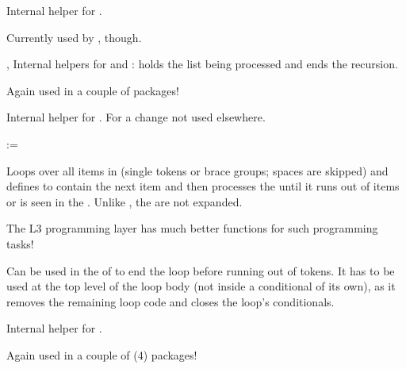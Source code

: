 \documentclass{l3in2edoc}
\begin{document}
\begin{function}[int]
  {
    \@forloop
  }
  Internal helper for .

  Currently used by , though.
\end{function}



\begin{function}[int]
  {
    \@fornoop,
    \@fortmp
  }
  Internal helpers for  and :  holds the
  list being processed and  ends the recursion.

  Again used in a couple of packages!
\end{function}



\begin{function}[int]
  {
    \@iforloop
  }
  Internal helper for . For a change not used elsewhere.
\end{function}


\begin{function}[]
  {
    \@tfor
  }
  \begin{syntax}
      :=   
  \end{syntax}
  Loops over all items in  (single tokens or brace groups;
  spaces are skipped) and defines  to contain the next
  item and then processes the  until it runs out of
  items or  is seen in the . Unlike
  , the  are not expanded.

  The L3 programming layer has much better functions for such
  programming tasks!
\end{function}

\begin{function}[]
  {
    \@break@tfor
  }
%
  Can be used in the  of  to end the loop
  before running out of tokens. It has to be used at the top level of
  the loop body (not inside a conditional of its own), as it removes
  the remaining loop code and closes the loop's conditionals.
\end{function}




\begin{function}[int]
  {
    \@tforloop
  }
  Internal helper for .

  Again used in a couple of (4) packages!
\end{function}
\end{document}
